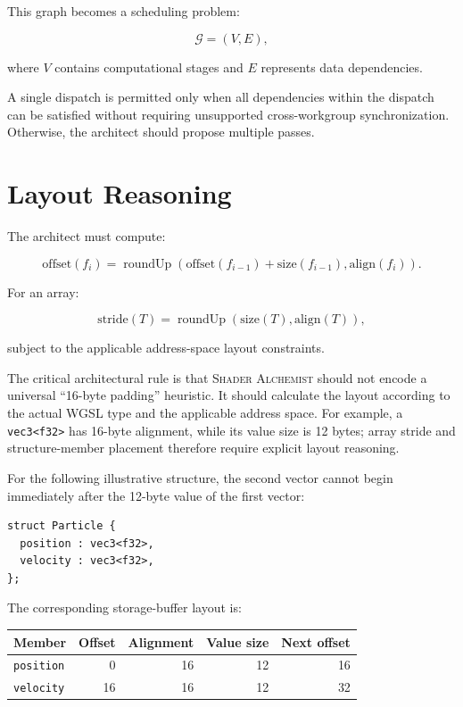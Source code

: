 \documentclass[11pt,a4paper,oneside]{report}
\newcommand{\SA}{\textsc{Shader Alchemist}}
\begin{document}
This graph becomes a scheduling problem:

\[
\mathcal{G}=(V,E),
\]

where $V$ contains computational stages and $E$ represents data dependencies.

A single dispatch is permitted only when all dependencies within the dispatch can be satisfied
without requiring unsupported cross-workgroup synchronization. Otherwise, the architect should
propose multiple passes.

\section{Layout Reasoning}

The architect must compute:

\begin{equation}
\mathrm{offset}(f_i)
=
\operatorname{roundUp}
\left(
\mathrm{offset}(f_{i-1})+\mathrm{size}(f_{i-1}),
\mathrm{align}(f_i)
\right).
\end{equation}

For an array:

\begin{equation}
\mathrm{stride}(T)
=
\operatorname{roundUp}
\left(
\mathrm{size}(T),
\mathrm{align}(T)
\right),
\end{equation}

subject to the applicable address-space layout constraints.

The critical architectural rule is that \SA{} should not encode a universal ``16-byte padding''
heuristic. It should calculate the layout according to the actual WGSL type and the applicable
address space. For example, a \texttt{vec3<f32>} has 16-byte alignment, while its value size is
12 bytes; array stride and structure-member placement therefore require explicit layout reasoning.

For the following illustrative structure, the second vector cannot begin immediately after the
12-byte value of the first vector:

\begin{lstlisting}[language=WGSL,caption={WGSL record whose padding affects host-side serialization.}]
struct Particle {
  position : vec3<f32>,
  velocity : vec3<f32>,
};
\end{lstlisting}

The corresponding storage-buffer layout is:

\begin{center}
\begin{tabular}{lrrrr}
\toprule
\textbf{Member} & \textbf{Offset} & \textbf{Alignment} & \textbf{Value size} & \textbf{Next offset}\\
\midrule
\texttt{position} & 0 & 16 & 12 & 16\\
\texttt{velocity} & 16 & 16 & 12 & 32\\
\bottomrule
\end{tabular}
\end{center}
\end{document}
